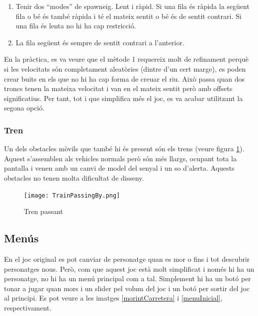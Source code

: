 \documentclass{article}
\begin{document}
\begin{enumerate}
	\item Tenir dos ``modes'' de spawneig. Lent i ràpid. Si una fila és
	ràpida la següent fila o bé és també ràpida i té el mateix sentit
	o bé és de sentit contrari. Si una fila és lenta no hi ha cap restricció.
	\item La fila següent és sempre de sentit contrari a l'anterior.
\end{enumerate}
En la pràctica, es va veure que el mètode 1 requereix molt de refinament perquè
si les velocitats són completament aleatòries (dintre d'un cert marge), es poden
crear buits en els que no hi ha cap forma de creuar el riu. Això passa quan
dos troncs tenen la mateixa velocitat i van en el mateix sentit però amb offsets
significatius. Per tant, tot i que simplifica més el joc,
es va acabar utilitzant la segona opció.

\subsubsection{Tren}

Un dels obstacles mòvils que també hi és present són els trens (veure figura 
\ref{trenPassant}). Aquest s'assemblen als vehicles normals però són més 
llargs, ocupant tota la pantalla i venen amb un canvi de model del senyal
i un so d'alerta. Aquests obstacles no tenen molta dificultat de disseny.

\begin{figure}[h!]
	\texttt{[image: TrainPassingBy.png]}
	\caption{Tren passant}
	\label{trenPassant}
\end{figure}

\subsection{Menús}

En el joc original es pot canviar de personatge quan es mor o fins i tot 
descubrir personatges nous. Però, com que aquest joc està molt simplificat i només
hi ha un personatge, no hi ha un menú principal com a tal. Simplement
hi ha un botó per tonar a jugar quan mors i un slider pel volum del joc
i un botó per sortir del joc al principi. Es pot veure
a les imatges \ref{morintCarretera} i \ref{menuInicial}, respectivament.
\end{document}
